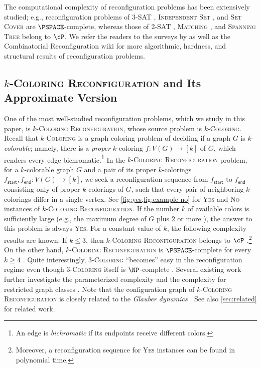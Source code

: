 \documentclass[11pt,fleqn]{article}
\renewcommand{\geq}{\geqslant}
\renewcommand{\leq}{\leqslant}
\newcommand{\prb}[1]{\textsc{#1}\xspace}
\newcommand{\sss}{\mathsf{start}}
\newcommand{\ttt}{\mathsf{end}}
\newcommand{\Yes}{\textsc{Yes}\xspace}
\newcommand{\No}{\textsc{No}\xspace}
\newcommand{\f}{f}
\newcommand{\kColReconf}{\prb{$k$-Coloring Reconfiguration}}
\theoremstyle{definition}
\numberwithin{equation}{section}
\begin{document}
The computational complexity of reconfiguration problems has been extensively studied; e.g.,
reconfiguration problems of
\prb{3-SAT} \cite{gopalan2009connectivity},
\prb{Independent Set} \cite{hearn2005pspace,hearn2009games}, and
\prb{Set Cover} \cite{ito2011complexity}
are $\PSPACE$-complete, whereas
those of
\prb{2-SAT} \cite{gopalan2009connectivity},
\prb{Matching} \cite{ito2011complexity}, and
\prb{Spanning Tree} \cite{ito2011complexity}
belong to $\cP$.
We refer the readers to the surveys by \citet{nishimura2018introduction,heuvel13complexity,mynhardt2019reconfiguration,bousquet2024survey}
as well as
the Combinatorial Reconfiguration wiki \cite{hoang2023combinatorial} for
more algorithmic, hardness, and structural results of reconfiguration problems.


\subsection{\kColReconf and Its Approximate Version}
One of the most well-studied reconfiguration problems,
which we study in this paper, is 
\kColReconf \cite{bonsma2009finding,cereceda2008connectedness,cereceda2011finding,cereceda2009mixing,cereceda2007mixing},
whose source problem is \prb{$k$-Coloring}.
Recall that \prb{$k$-Coloring} is a graph coloring problem of 
deciding if a graph $G$ is \emph{$k$-colorable}; namely,
there is a \emph{proper} $k$-coloring $\f \colon V(G) \to [k]$ of $G$, which
renders every edge bichromatic.\footnote{
An edge is \emph{bichromatic} if its endpoints receive different colors.
}
In the \kColReconf problem,
for a $k$-colorable graph $G$ and a pair of its proper $k$-colorings $\f_\sss,\f_\ttt \colon V(G) \to [k]$,
we seek a reconfiguration sequence from $\f_\sss$ to $\f_\ttt$
consisting only of proper $k$-colorings of $G$, such that
every pair of neighboring $k$-colorings differ in a single vertex.
See \cref{fig:yes,fig:example-no} for \Yes and \No instances of \kColReconf.
If the number $k$ of available colors is sufficiently large
(e.g., the maximum degree of $G$ plus $2$ or more \cite{jerrum1995very,dyer2006randomly}),
the answer to this problem is always \Yes.
For a constant value of $k$, the following complexity results are known:
If $k \leq 3$, then \kColReconf belongs to $\cP$ \cite{cereceda2011finding}.\footnote{
Moreover, a reconfiguration sequence for \Yes instances can be found in polynomial time.
}
On the other hand, \kColReconf is $\PSPACE$-complete for every $k \geq 4$ \cite{bonsma2009finding}.
Quite interestingly, \prb{$3$-Coloring} ``becomes'' easy
in the reconfiguration regime even though \prb{$3$-Coloring} itself is $\NP$-complete
\cite{garey1976some,lovasz1973coverings,stockmeyer1973planar}.
Several existing work further investigate the parameterized complexity 
\cite{johnson2016finding,bonsma2014complexity}
and the complexity for restricted graph classes
\cite{bonamy2013recoloring,bonamy2014reconfiguration,wrochna2018reconfiguration,cereceda2009mixing,bonamy2011diameter,hatanaka2019coloring}.
Note that the configuration graph of \kColReconf is closely related to
the \emph{Glauber dynamics} \cite{jerrum1995very,molloy2004glauber,dyer2006randomly}.
See also \cref{sec:related} for related work.
\end{document}
